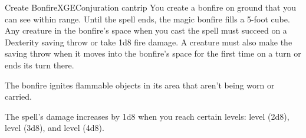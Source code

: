 \begin{spell}{Create Bonfire}{XGE}{Conjuration cantrip}
{
}
You create a bonfire on ground that you can see within
range. Until the spell ends, the magic bonfire fills a
5-foot cube. Any creature in the bonfire's space when you
cast the spell must succeed on a Dexterity saving throw or
take 1d8 fire damage. A creature must also make the saving
throw when it moves into the bonfire's space for the first
time on a turn or ends its turn there.

The bonfire ignites flammable objects in its area that
aren't being worn or carried.

 The spell's damage increases
by 1d8 when you reach certain levels:  level (2d8),
 level (3d8), and  level (4d8).
\end{spell}
